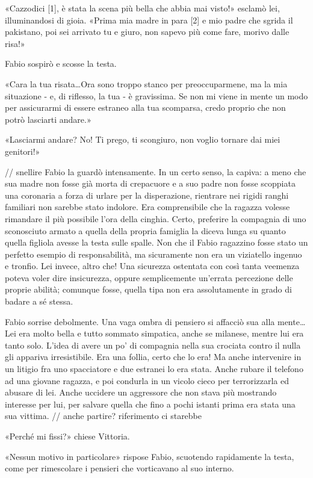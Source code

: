 «Cazzodici [1], è stata la scena più bella che abbia mai visto!» esclamò lei, illuminandosi di gioia. «Prima mia madre in para [2] e mio padre che sgrida il pakistano, poi sei arrivato tu e giuro, non sapevo più come fare, morivo dalle risa!»

Fabio sospirò e scosse la testa.

«Cara la tua risata\ldots Ora sono troppo stanco per preoccuparmene, ma la mia situazione - e, di riflesso, la tua - è gravissima. Se non mi viene in mente un modo per assicurarmi di essere estraneo alla tua scomparsa, credo proprio che non potrò lasciarti andare.»

«Lasciarmi andare? No! Ti prego, ti scongiuro, non voglio tornare dai miei genitori!»

// snellire
Fabio la guardò intensamente. In un certo senso, la capiva: a meno che sua madre non fosse già morta di crepacuore e a suo padre non fosse scoppiata una coronaria a forza di urlare per la disperazione, rientrare nei rigidi ranghi familiari non sarebbe stato indolore. Era comprensibile che la ragazza volesse rimandare il più possibile l'ora della cinghia. Certo, preferire la compagnia di uno sconosciuto armato a quella della propria famiglia la diceva lunga su quanto quella figliola avesse la testa sulle spalle. Non che il Fabio ragazzino fosse stato un perfetto esempio di responsabilità, ma sicuramente non era un viziatello ingenuo e tronfio. Lei invece, altro che! Una sicurezza ostentata con così tanta veemenza poteva voler dire insicurezza, oppure semplicemente un'errata percezione delle proprie abilità; comunque fosse, quella tipa non era assolutamente in grado di badare a sé stessa.

Fabio sorrise debolmente. Una vaga ombra di pensiero si affacciò sua alla mente\ldots Lei era molto bella e tutto sommato simpatica, anche se milanese, mentre lui era tanto solo. L'idea di avere un po' di compagnia nella sua crociata contro il nulla gli appariva irresistibile. Era una follia, certo che lo era! Ma anche intervenire in un litigio fra uno spacciatore e due estranei lo era stata. Anche rubare il telefono ad una giovane ragazza, e poi condurla in un vicolo cieco per terrorizzarla ed abusare di lei. Anche uccidere un aggressore che non stava più mostrando interesse per lui, per salvare quella che fino a pochi istanti prima era stata una sua vittima. // anche partire? riferimento ci starebbe

«Perché mi fissi?» chiese Vittoria.

«Nessun motivo in particolare» rispose Fabio, scuotendo rapidamente la testa, come per rimescolare i pensieri che vorticavano al suo interno.

